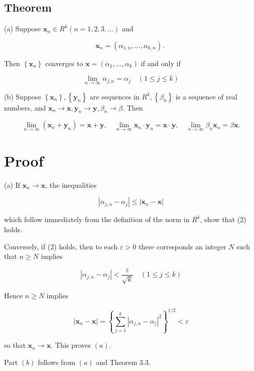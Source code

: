 \documentclass[10pt]{article}
\begin{document}
\subsection{Theorem}
(a) Suppose $\mathbf{x}_{n} \in R^{k}(n=1,2,3, \ldots)$ and

$$
\mathbf{x}_{n}=\left(\alpha_{1, n}, \ldots, \alpha_{k, n}\right) \text {. }
$$

Then $\left\{\mathbf{x}_{n}\right\}$ converges to $\mathbf{x}=\left(\alpha_{1}, \ldots, \alpha_{k}\right)$ if and only if

$$
\lim _{n \rightarrow \infty} \alpha_{j, n}=\alpha_{j} \quad(1 \leq j \leq k)
$$

(b) Suppose $\left\{\mathbf{x}_{n}\right\},\left\{\mathbf{y}_{n}\right\}$ are sequences in $R^{k},\left\{\beta_{n}\right\}$ is a sequence of real numbers, and $\mathbf{x}_{n} \rightarrow \mathbf{x}, \mathbf{y}_{n} \rightarrow \mathbf{y}, \beta_{n} \rightarrow \beta$. Then

$$
\lim _{n \rightarrow \infty}\left(\mathbf{x}_{n}+\mathbf{y}_{n}\right)=\mathbf{x}+\mathbf{y}, \quad \lim _{n \rightarrow \infty} \mathbf{x}_{n} \cdot \mathbf{y}_{n}=\mathbf{x} \cdot \mathbf{y}, \quad \lim _{n \rightarrow \infty} \beta_{n} \mathbf{x}_{n}=\beta \mathbf{x} .
$$

\section{Proof}
(a) If $\mathbf{x}_{n} \rightarrow \mathbf{x}$, the inequalities

$$
\left|\alpha_{j, n}-\alpha_{j}\right| \leq\left|\mathbf{x}_{n}-\mathbf{x}\right|
$$

which follow immediately from the definition of the norm in $R^{k}$, show that (2) holds.

Conversely, if (2) holds, then to each $\varepsilon>0$ there corresponds an integer $N$ such that $n \geq N$ implies

$$
\left|\alpha_{j, n}-\alpha_{j}\right|<\frac{\varepsilon}{\sqrt{k}} \quad(1 \leq j \leq k)
$$

Hence $n \geq N$ implies

$$
\left|\mathbf{x}_{n}-\mathbf{x}\right|=\left\{\sum_{j=1}^{k}\left|\alpha_{j, n}-\alpha_{j}\right|^{2}\right\}^{1 / 2}<\varepsilon
$$

so that $\mathbf{x}_{n} \rightarrow \mathbf{x}$. This proves $(a)$.

Part $(b)$ follows from $(a)$ and Theorem 3.3.
\end{document}

